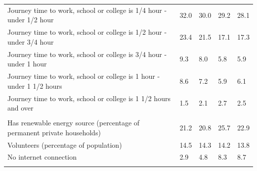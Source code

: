 \documentclass{article}
\begin{document}
\begin{table}[h]
\begin{tabular}{KTTTT}
Journey time to work, school or college is 1/4 hour - under 1/2 hour & 32.0& 30.0& 29.2& 28.1\\
Journey time to work, school or college is 1/2 hour - under 3/4 hour & 23.4& 21.5& 17.1& 17.3\\
Journey time to work, school or college is 3/4 hour - under 1 hour & 9.3& 8.0& 5.8& 5.9\\
Journey time to work, school or college is 1 hour - under 1 1/2 hours & 8.6& 7.2& 5.9& 6.1\\
Journey time to work, school or college is 1 1/2 hours and over & 1.5& 2.1& 2.7& 2.5\\
\hline
    \\ 
    \hline
Has renewable energy source (percentage of permanent private households) & 21.2& 20.8& 25.7& 22.9\\
    \hline
Volunteers (percentage of population) & 14.5& 14.3& 14.2& 13.8\\
    \hline
No internet connection& 2.9& 4.8& 8.3& 8.7\\
\hline
\end{tabular}
\end{table}
\end{document}
